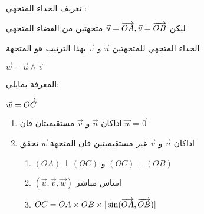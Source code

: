 \begin{frame}

\begin{minipage}{.75\textwidth}

	\begin{block}{تعريف  الجداء المتجهي :}
	
	ليكن 
	$ 	\vec{u}=\overrightarrow{OA},\vec{v}=\overrightarrow{OB}$
	 متجهتين من الفضاء المتجهي
	  
	الجداء المتجهي للمتجهتين 
		$ 	\vec{u}$ و $\vec{v}$
	بهذا الترتيب هو المتجهة 
	 
	$	\vec{w}= \vec{u} \land \vec{v}$
	
	 المعرفة بمايلي:
	 
	 		$	\vec{w}=\overrightarrow{OC}$
	 		  
	 			  \begin{enumerate}\RTListe
	 			\item 
	اذاكان 	
	$ 	\vec{u}$ و $\vec{v}$ 
	مستقيميتان فان
		 		$	\vec{w}=\vec{0}$
		 		\item 
	اذاكان 
		$ 	\vec{u}$ و $\vec{v}$
	 غير مستقيميتين فان المتجهة
$\vec{w} $
	  تحقق
	
	  \begin{enumerate}\RTListe
	  	\item 
	$ (OA) 	 \perp	(OC)  $ و	$ (OC) \perp  (OB) $
	\item 
	$  (	\vec{u},\vec{v},\vec{w}) $
	اساس مباشر 
	\item 
$ 	OC= OA \times OB \times | \sin ( \overrightarrow{OA} ,\overrightarrow{OB} )| $
	  \end{enumerate}
	  \end{enumerate}

	\end{block}
	
\end{minipage}	
	

\end{frame}
